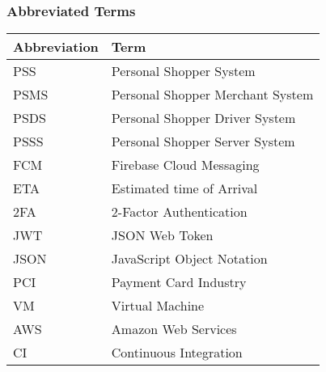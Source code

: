 \subsubsection{Abbreviated Terms}
\begin{center}
    \begin{tabular}{p{}p{}}
    \hline
    \textbf{Abbreviation} & \textbf{Term} \\ 
     \hline
     PSS & Personal Shopper System \\  
     \hline
     PSMS &  Personal Shopper Merchant System \\  
     \hline
     PSDS &  Personal Shopper Driver System \\  
     \hline
     PSSS &  Personal Shopper Server System \\  
     \hline
     FCM &  Firebase Cloud Messaging \\  
     \hline
     ETA & Estimated time of Arrival \\  
     \hline
     2FA & 2-Factor Authentication  \\  
     \hline
     JWT & JSON Web Token  \\  
     \hline
     JSON & JavaScript Object Notation \\ 
     \hline
     PCI & Payment Card Industry \\ 
     \hline
     VM & Virtual Machine \\ 
     \hline
     AWS & Amazon Web Services \\ 
     \hline
     CI & Continuous Integration \\ 
     \hline
    \end{tabular}
\end{center}
\pagebreak
